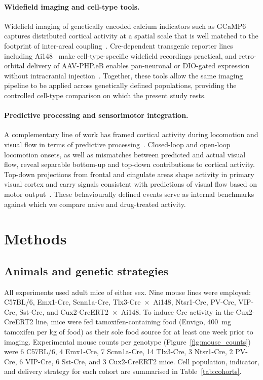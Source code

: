 \documentclass[11pt]{article}
\begin{document}
\paragraph{Widefield imaging and cell-type tools.}
Widefield imaging of genetically encoded calcium indicators such as GCaMP6~\citep{chen2013ultrasensitive} captures distributed cortical activity at a spatial scale that is well matched to the footprint of inter-areal coupling~\citep{musall2019single, leinweber2017sensorimotor}. Cre-dependent transgenic reporter lines including Ai148~\citep{daigle2018suite, bounds2023alloptical} make cell-type-specific widefield recordings practical, and retro-orbital delivery of AAV-PHP.eB enables pan-neuronal or DIO-gated expression without intracranial injection~\citep{chan2017engineered}. Together, these tools allow the same imaging pipeline to be applied across genetically defined populations, providing the controlled cell-type comparison on which the present study rests.

\paragraph{Predictive processing and sensorimotor integration.}
A complementary line of work has framed cortical activity during locomotion and visual flow in terms of predictive processing~\citep{keller2012sensorimotor, keller2018predictive, zmarz2016mismatch, attinger2017visuomotor, leinweber2017sensorimotor}. Closed-loop and open-loop locomotion onsets, as well as mismatches between predicted and actual visual flow, reveal separable bottom-up and top-down contributions to cortical activity. Top-down projections from frontal and cingulate areas shape activity in primary visual cortex and carry signals consistent with predictions of visual flow based on motor output~\citep{leinweber2017sensorimotor}. These behaviourally defined events serve as internal benchmarks against which we compare naive and drug-treated activity.

\section{Methods}

\subsection{Animals and genetic strategies}
All experiments used adult mice of either sex. Nine mouse lines were employed: C57BL/6, Emx1-Cre, Scnn1a-Cre, Tlx3-Cre~$\times$~Ai148, Ntsr1-Cre, PV-Cre, VIP-Cre, Sst-Cre, and Cux2-CreERT2~$\times$~Ai148. To induce Cre activity in the Cux2-CreERT2 line, mice were fed tamoxifen-containing food (Envigo, 400~mg tamoxifen per kg of food) as their sole food source for at least one week prior to imaging. Experimental mouse counts per genotype (Figure~\ref{fig:mouse_counts}) were 6 C57BL/6, 4 Emx1-Cre, 7 Scnn1a-Cre, 14 Tlx3-Cre, 3 Ntsr1-Cre, 2 PV-Cre, 6 VIP-Cre, 6 Sst-Cre, and 3 Cux2-CreERT2 mice. Cell population, indicator, and delivery strategy for each cohort are summarised in Table~\ref{tab:cohorts}.
\end{document}
